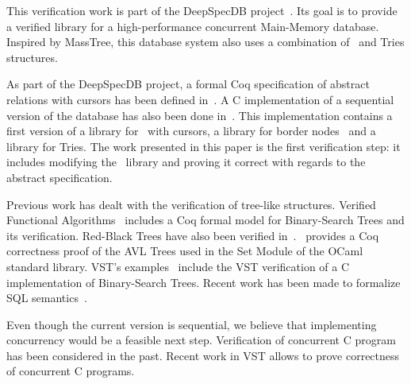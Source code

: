 This verification work is part of the DeepSpecDB project~\cite{deepdb}.
Its goal is to provide a verified library for a high-performance concurrent Main-Memory database.
Inspired by MassTree, this database system also uses a combination of \btrees\ and Tries structures.

As part of the DeepSpecDB project, a formal Coq specification of abstract relations with cursors has been defined in~\cite{brian}.
A C implementation of a sequential version of the database has also been done in~\cite{tosin}.
This implementation contains a first version of a library for \btrees\ with cursors, a library for border nodes~\cite{masstree} and a library for Tries.
The work presented in this paper is the first verification step: it includes modifying the \btrees\ library and proving it correct with regards to the abstract specification.

Previous work has dealt with the verification of tree-like structures.
Verified Functional Algorithms~\cite{vfa} includes a Coq formal model for Binary-Search Trees and its verification.
Red-Black Trees have also been verified in~\cite{redblack}. \cite{functors}~provides a Coq correctness proof of the AVL Trees used in the Set Module of the OCaml standard library.
VST's examples~\cite{vst} include the VST verification of a C implementation of Binary-Search Trees.
Recent work has been made to formalize SQL semantics~\cite{coqsql}.

Even though the current version is sequential, we believe that implementing concurrency would be a feasible next step.
Verification of concurrent C program has been considered in the past.
Recent work in VST allows to prove correctness of concurrent C programs.


